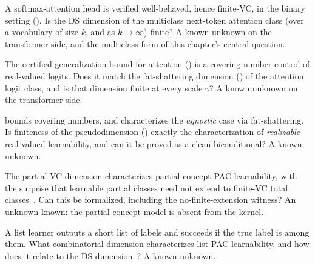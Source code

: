 \begin{openprob}
\label{open:attention-ds}
A softmax-attention head is verified well-behaved, hence finite-VC, in the
binary setting ().  Is the DS dimension of
the multiclass next-token attention class (over a vocabulary of size $k$, and
as $k \to \infty$) finite?  A known unknown on the transformer side, and the
multiclass form of this chapter's central question.
\end{openprob}

\begin{openprob}
\label{open:attention-fat}
The certified generalization bound for attention () is
a covering-number control of real-valued logits.  Does it match the
fat-shattering dimension () of the attention logit
class, and is that dimension finite at every scale $\gamma$?  A known unknown on
the transformer side.
\end{openprob}

\begin{openprob}
\label{open:pdim-realizable}
 bounds covering numbers, and
 characterizes the \emph{agnostic} case via
fat-shattering.  Is finiteness of the pseudodimension ()
exactly the characterization of \emph{realizable} real-valued learnability, and
can it be proved as a clean biconditional?  A known unknown.
\end{openprob}

\begin{openprob}
\label{open:partial-formal}
The partial VC dimension characterizes partial-concept PAC learnability, with
the surprise that learnable partial classes need not extend to finite-VC total
classes~\cite{AlonHannekeHolzmanMoran2021}.  Can this be formalized, including
the no-finite-extension witness?  An unknown known: the partial-concept model
is absent from the kernel.
\end{openprob}

\begin{openprob}
\label{open:list-learning}
A list learner outputs a short list of labels and succeeds if the true label
is among them.  What combinatorial dimension characterizes list PAC
learnability, and how does it relate to the DS
dimension~\cite{BrukhimCarmonDinurMoranYehudayoff2022}?  A known unknown.
\end{openprob}

